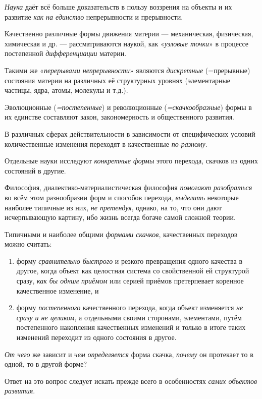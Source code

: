 \documentclass[a4paper,14pt,russian]{extreport}
\begin{document}
\emph{Наука} даёт всё больше доказательств в пользу воззрения на объекты и их развитие \emph{как на единство} непрерывности и прерывности.

Качественно различные формы движения материи --- механическая, физическая, химическая и др. --- рассматриваются наукой, как «\emph{узловые точки}» в процессе постепенной \emph{дифференциации} материи.

Такими же «\emph{перерывами непрерывности}» являются \emph{дискретные} (=прерывные) состояния материи на различных её структурных уровнях (элементарные частицы, ядра, атомы, молекулы и т.д.).

Эволюционные (\emph{=постепенные}) и революционные (\emph{=скачкообразные}) формы в их единстве составляют закон, закономерность и общественного развития.

В различных сферах действительности в зависимости от специфических условий количественные изменения переходят в качественные \emph{по-разному}.

Отдельные науки исследуют \emph{конкретные формы} этого перехода, скачков из одних состояний в другие.

Философия, диалектико-материалистическая философия \emph{помогают} \emph{разобраться} во всём этом разнообразии форм и способов перехода, \emph{выделить} некоторые наиболее типичные из них, \emph{не претендуя}, однако, на то, что они дают исчерпывающую картину, ибо жизнь всегда богаче самой сложной теории.

Типичными и наиболее общими \emph{формами скачков}, качественных переходов можно считать:

\begin{enumerate}
\item форму \emph{сравнительно быстрого} и резкого превращения одного качества в другое, когда объект как целостная система со свойственной ей структурой сразу, \emph{как бы одним приёмом} или серией приёмов претерпевает коренное качественное изменение, и
\item форму \emph{постепенного} качественного перехода, когда объект изменяется \emph{не сразу и не целиком}, а отдельными своими сторонами, элементами, путём постепенного накопления качественных изменений и только в итоге таких изменений переходит из одного состояния в другое.
\end{enumerate}

\emph{От чего} же зависит и \emph{чем определяется} форма скачка, \emph{почему} он протекает то в одной, то в другой форме?

Ответ на это вопрос следует искать прежде всего в особенностях \emph{самих объектов развития}.
\end{document}
